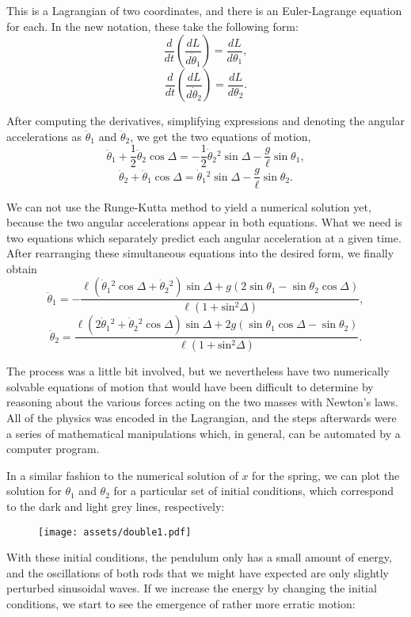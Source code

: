 \documentclass[11pt]{article}
\begin{document}
This is a Lagrangian of two coordinates, and there is an Euler\hyp{}Lagrange equation for each. In the new notation, these take the following form:
$$\frac{d}{dt}\left(\frac{dL}{d\dot{\theta}_1}\right)=\frac{dL}{d\theta_1},$$
$$\frac{d}{dt}\left(\frac{dL}{d\dot{\theta}_2}\right)=\frac{dL}{d\theta_2}.$$

After computing the derivatives, simplifying expressions and denoting the angular accelerations as $\ddot{\theta}_1$ and $\ddot{\theta}_2$, we get the two equations of motion,
$$\ddot{\theta}_1+\frac{1}{2}\ddot{\theta}_2\cos\Delta=-\frac{1}{2}\dot{\theta}_2{}^2\sin\Delta-\frac{g}{\ell}\sin\theta_1,$$
$$\ddot{\theta}_2+\ddot{\theta}_1\cos\Delta=\dot{\theta}_1{}^2\sin\Delta-\frac{g}{\ell}\sin\theta_2.$$

We can not use the Runge\hyp{}Kutta method to yield a numerical solution yet, because the two angular accelerations appear in both equations. What we need is two equations which separately predict each angular acceleration at a given time. After rearranging these simultaneous equations into the desired form, we finally obtain
{\small$$\ddot{\theta}_1=-\frac{\ell(\dot{\theta}_1{}^2\cos\Delta+\dot{\theta}_2{}^2)\sin\Delta+g(2\sin\theta_1-\sin\theta_2\cos\Delta)}{\ell(1+\text{sin}{}^2\Delta)},$$}
{\small$$\ddot{\theta}_2=\frac{\ell(2\dot{\theta}_1{}^2+\dot{\theta}_2{}^2\cos\Delta)\sin\Delta+2g(\sin\theta_1\cos\Delta-\sin\theta_2)}{\ell(1+\text{sin}{}^2\Delta)}.$$}
\newpage

The process was a little bit involved, but we nevertheless have two numerically solvable equations of motion that would have been difficult to determine by reasoning about the various forces acting on the two masses with Newton's laws. All of the physics was encoded in the Lagrangian, and the steps afterwards were a series of mathematical manipulations which, in general, can be automated by a computer program.
\newline

In a similar fashion to the numerical solution of $x$ for the spring, we can plot the solution for $\theta_1$ and $\theta_2$ for a particular set of initial conditions, which correspond to the dark and light grey lines, respectively:

\begin{figure}[htbp]
\centering
\texttt{[image: assets/double1.pdf]}
\label{plot:double1}
\end{figure}

With these initial conditions, the pendulum only has a small amount of energy, and the oscillations of both rods that we might have expected are only slightly perturbed sinusoidal waves. If we increase the energy by changing the initial conditions, we start to see the emergence of rather more erratic motion:
\end{document}
